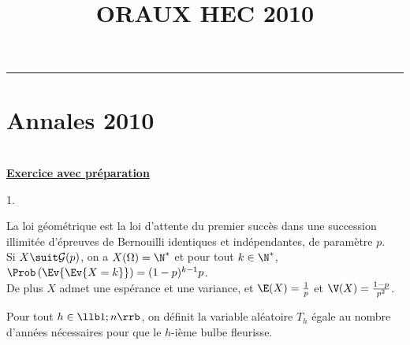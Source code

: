 \documentclass[11pt]{article}%
\title{\bf \vspace{-1cm} ORAUX HEC 2010} %
\author{} %
\date{} %
\begin{document}
\maketitle %
\vspace{-1.2cm}\hrule %
\thispagestyle{fancy}

\vspace*{.4cm}


\section{Annales 2010}


 \begin{exercice} \indent \\
 \textbf{\underline{Exercice avec préparation}} \\
 \begin{noliste}{1.}
 \setlength{\itemsep}{4mm}
 \item La loi géométrique est la loi d'attente du premier succès dans
une succession illimitée d'épreuves de Bernouilli identiques et
indépendantes, de paramètre $p$. \\
 Si $X \suit \mathcal{G} (p)$, on a $X(\Omega) = \N^*$ et pour tout $k
\in \N^*$, $\Prob\left(\Ev{\Ev{X = k}}\right) = (1-p)^{k-1} p$. \\
 De plus $X$ admet une espérance et une variance, et $\E(X) =
\frac{1}{p}$ et $\V(X) = \frac{1-p}{p^{2}}$. \\
 \item Pour tout $h \in \llb 1 ; n \rrb$, on définit la variable
aléatoire $T_{h}$ égale au nombre d'années nécessaires pour que le
$h$-ième bulbe fleurisse. 
\end{noliste}
\end{exercice}
\end{document}
